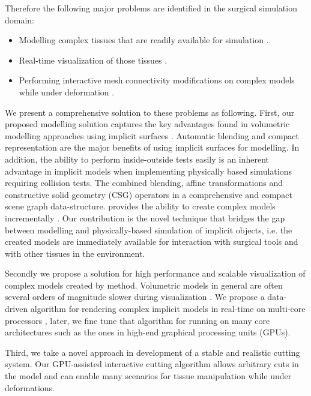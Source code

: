 Therefore the following major problems are identified in the surgical simulation domain:

\begin{itemize}
 \item Modelling complex tissues that are readily available for simulation \cite{Nealen2006,Meier2005,Gibson1997a}.
 \item Real-time visualization of those tissues \cite{Mario2010PolygonMesh,Bloomenthal1997}.
 \item Performing interactive mesh connectivity modifications on complex models 
 while under deformation \cite{Jin2013, Wu2011, Courtecuisse2010, Jerabkova2010}. 
\end{itemize}

We present a comprehensive solution to these problems as following. 
First, our proposed modelling solution captures the key advantages found in volumetric modelling approaches using 
implicit surfaces \cite{Bloomenthal1997, Wyvill1986, Wyvill1999, Wyvill1996, Wyvill1997, Schmidt2006, Bernhardt2010}. Automatic blending and compact 
representation are the major benefits of using implicit surfaces for modelling. In addition, the ability to perform inside-outside tests 
easily is an inherent advantage in implicit models when implementing physically based simulations requiring collision tests. 
The \blob \cite{Wyvill1999} combined blending, affine transformations and constructive solid geometry (CSG) operators in a 
comprehensive and compact scene graph data-structure. \blob provides the ability to create complex models 
incrementally \cite{Schmidt2006}. Our contribution is the novel technique that bridges the gap between 
modelling and physically-based simulation of implicit objects, i.e. the created models are immediately 
available for interaction with surgical tools and with other tissues in the environment. 

Secondly we propose a solution for high performance and scalable visualization of complex models created by \blob method.
Volumetric models in general are often several orders of magnitude slower during visualization \cite{Bloomenthal1990a, Bloomenthal1997}.
We propose a data-driven algorithm for rendering complex implicit models in real-time on multi-core processors \cite{Shirazian2012}, later, we 
fine tune that algorithm for running on many core architectures such as the ones in high-end graphical processing units (GPUs). 

Third, we take a novel approach in development of a stable and realistic cutting system. Our GPU-assisted 
interactive cutting algorithm allows arbitrary cuts in the model and can enable many scenarios for tissue 
manipulation while under deformations. 

